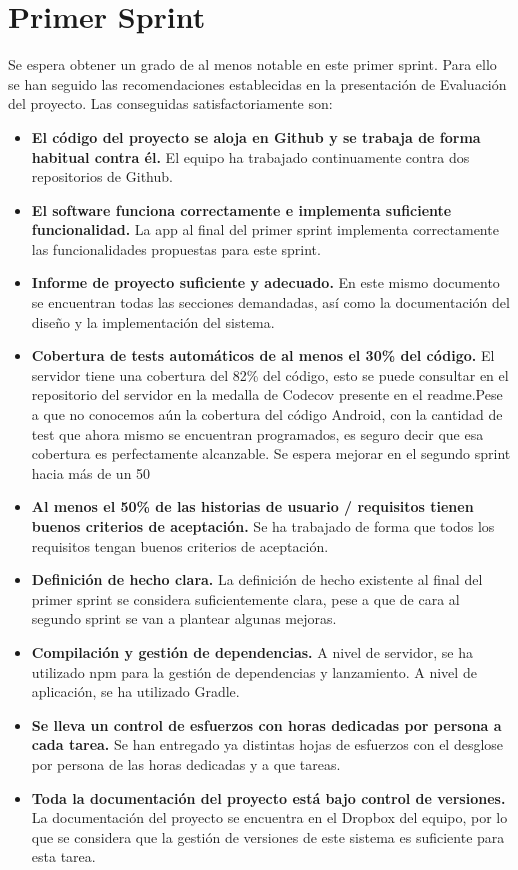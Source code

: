 \documentclass[11pt,a4paper]{report}
\begin{document}
\section{Primer Sprint}
Se espera obtener un grado de al menos notable en este primer sprint. Para ello se han seguido las recomendaciones establecidas en la presentación de Evaluación del proyecto. Las conseguidas satisfactoriamente son:
\begin{itemize}
	\item \textbf{El código del proyecto se aloja en Github y se trabaja de forma habitual contra él.} El equipo ha trabajado continuamente contra dos repositorios de Github.
	\item \textbf{El software funciona correctamente e implementa suficiente funcionalidad.} La app al final del primer sprint implementa correctamente las funcionalidades propuestas para este sprint.
	\item \textbf{Informe de proyecto suficiente y adecuado.} En este mismo documento se encuentran todas las secciones demandadas, así como la documentación del diseño y la implementación del sistema.
	\item \textbf{Cobertura de tests automáticos de al menos el 30\% del código.} El servidor tiene una cobertura del 82\% del código, esto se puede consultar en el repositorio del servidor en la medalla de Codecov presente en el readme.Pese a que no conocemos aún la cobertura del código Android, con la cantidad de test que ahora mismo se encuentran programados, es seguro decir que esa cobertura es perfectamente alcanzable. Se espera mejorar en el segundo sprint hacia más de un 50%
	\item \textbf{Al menos el 50\% de las historias de usuario / requisitos tienen buenos criterios de aceptación.} Se ha trabajado de forma que todos los requisitos tengan buenos criterios de aceptación.
	\item \textbf{Definición de hecho clara.} La definición de hecho existente al final del primer sprint se considera suficientemente clara, pese a que de cara al segundo sprint se van a plantear algunas mejoras.
	\item \textbf{Compilación y gestión de dependencias.} A nivel de servidor, se ha utilizado npm para la gestión de dependencias y lanzamiento. A nivel de aplicación, se ha utilizado Gradle.
	\item \textbf{Se lleva un control de esfuerzos con horas dedicadas por persona a cada tarea.} Se han entregado ya distintas hojas de esfuerzos con el desglose por persona de las horas dedicadas y a que tareas.
	\item \textbf{Toda la documentación del proyecto está bajo control de versiones.} La documentación del proyecto se encuentra en el Dropbox del equipo, por lo que se considera que la gestión de versiones de este sistema es suficiente para esta tarea.
\end{itemize}
\end{document}
